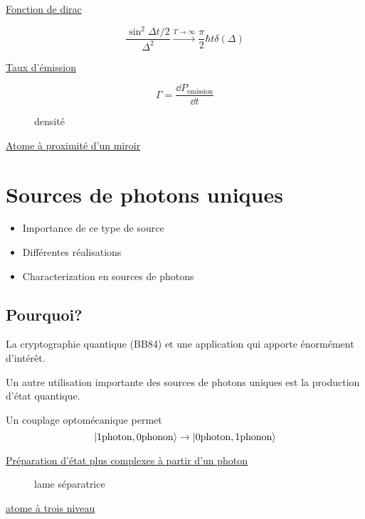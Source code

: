 \underline{Fonction de dirac} 

$$\frac{\sin^{2}\Delta t/2}{\Delta^{2}} \xrightarrow{T\to \infty} \frac{\pi}{2} \hbar t \delta(\Delta) $$ 

\underline{Taux d'émission} 

$$\Gamma = \frac{\dd P_{\text{emission}} }{\dd t} $$ 

\begin{figure}[ht]
    \centering
    \caption{densité}
    \label{fig:densité}
\end{figure}


\underline{Atome à proximité d'un miroir} 

\setcounter{section}{2}

\section{Sources de photons uniques}

\begin{tcolorbox}[title=Objectifs]
	 \begin{itemize}
	 	\item Importance de ce type de source
		\item Différentes réalisations
		\item Characterization en sources de photons 
	 \end{itemize}
\end{tcolorbox}

\subsection{Pourquoi?}

La cryptographie quantique (BB84) et une application qui apporte énormément d'intérêt.

Un autre utilisation importante des sources de photons uniques est la production d'état quantique.


Un couplage optomécanique permet $$\ket{1 \text{photon}, 0	\text{phonon}   } \to \ket{0 \text{photon}, 1 \text{phonon}  }$$ 

\underline{Préparation d'état plus complexes à partir d'un photon} 

\begin{figure}[ht]
    \centering
    \caption{lame séparatrice}
    \label{fig:lame-séparatrice}
\end{figure}


\underline{atome à trois niveau} 

